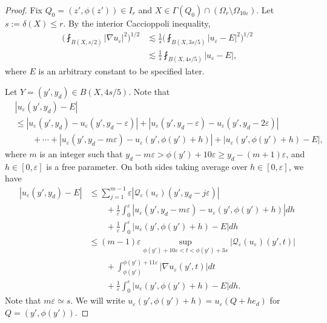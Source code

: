 \documentclass[reqno,12pt]{amsart} %
\theoremstyle{definition}
\theoremstyle{remark}
\numberwithin{equation}{section}
\newcommand{\Q}{\mathcal{Q}}
\newcommand{\e}{\varepsilon}
\begin{document}
\begin{proof}
Fix $Q_0 = (z',\phi(z')) \in I_r$ and $X \in \Gamma(Q_0) \cap (\Omega_{r} \setminus \Omega_{10\e})$. Let $s:= \delta(X) \le r$. 
By the interior Caccioppoli inequality,
\begin{equation}\label{est.Due2ue-E}
\begin{aligned}
    \bigg( \fint_{B(X,s/2)} |\nabla u_\e|^2 \bigg)^{1/2} & \lesssim \frac{1}{s} \bigg( \fint_{B(X,3s/5)} | u_\e - E|^2 \bigg)^{1/2} \\
    & \lesssim \frac{1}{s} \fint_{B(X,4s/5)} |u_\e - E|,
    \end{aligned}
\end{equation}
where $E$ is an arbitrary constant to be specified later.

Let $Y = (y',y_d) \in B(X, 4s/5)$.
Note that 
\begin{equation}
\begin{aligned}
    & |u_\e(y',y_d) - E| \\
    & \le |u_\e(y',y_d) - u_\e(y',y_d-\e)| +  |u_\e(y',y_d-\e) - u_\e(y',y_d-2\e)| \\
    & \qquad + \cdots + |u_\e(y',y_d-m\e) - u_\e(y',\phi(y') + h)| + |u_\e(y',\phi(y') + h) - E|,
    \end{aligned}
\end{equation}
where $m$ is an integer such that $y_d-m\e > \phi(y')+10\e \ge y_d-(m+1)\e $, and $h \in [0,\e]$ is a free parameter. On both sides taking average over $h\in [0,\e]$, we have
\begin{equation}\label{est.ue-E}
\begin{aligned}
     |u_\e(y',y_d) - E| & \le \sum_{j= 1}^{m-1} \e |\Q_\e(u_\e)(y',y_d - j \e)| \\
     & \qquad + \frac{1}{\e} \int_0^\e |u_\e(y',y_d-m\e) - u_\e(y',\phi(y') + h)|dh \\
     & \qquad + \frac{1}{\e} \int_0^\e |u_\e(y',\phi(y') + h) - E|dh \\
    & \le (m-1) \e \sup_{\phi(y')+10\e < t <\phi(y') + 3s} |\Q_\e(u_\e)(y',t)| \\
    & \qquad + \int_{\phi(y')}^{\phi(y') + 11\e} |\nabla u_\e(y',t)| dt \\
    & \qquad + \frac{1}{\e} \int_0^\e |u_\e(y',\phi(y') + h) - E| dh.
\end{aligned}
\end{equation}
Note that $m\e \simeq s$. We will write $u_\e(y',\phi(y') + h) = u_\e(Q + he_d)$ for $Q = (y', \phi(y'))$.


\end{proof}
\end{document}
